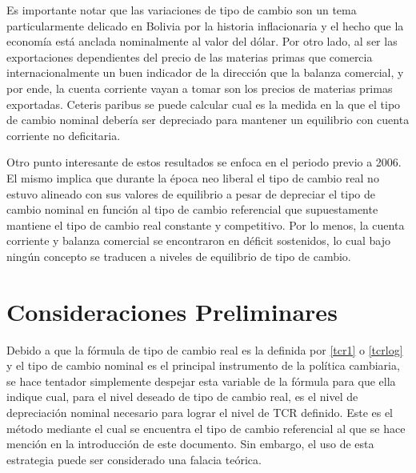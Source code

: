 \documentclass[12pt,letterpaper]{article}
\begin{document}
Es importante notar que las variaciones de tipo de cambio son un tema particularmente delicado en Bolivia por la historia inflacionaria y el hecho que la economía está anclada nominalmente al valor del dólar. Por otro lado, al ser las exportaciones dependientes del precio de las materias primas que comercia internacionalmente un buen indicador de la dirección que la balanza comercial, y por ende, la cuenta corriente vayan a tomar son los precios de materias primas exportadas. Ceteris paribus se puede calcular cual es la medida en la que el tipo de cambio nominal debería ser depreciado para mantener un equilibrio con cuenta corriente no deficitaria.

Otro punto interesante de estos resultados se enfoca en el periodo previo a 2006. El mismo implica que durante la época neo liberal el tipo de cambio real no estuvo alineado con sus valores de equilibrio a pesar de depreciar el tipo de cambio nominal en función al tipo de cambio referencial que supuestamente  mantiene el tipo de cambio real constante y competitivo. Por lo menos, la cuenta corriente y balanza comercial se encontraron en déficit sostenidos, lo cual bajo ningún concepto se traducen a niveles de equilibrio de tipo de cambio.







\section{Consideraciones Preliminares}\label{consid}


Debido a que la fórmula de tipo de cambio real es la definida por \ref{tcr1} o \ref{tcrlog} y el tipo de cambio nominal es el principal instrumento de la política cambiaria, se hace tentador simplemente despejar esta variable de la fórmula para que ella indique cual, para el nivel deseado de tipo de cambio real, es el nivel de depreciación nominal necesario para lograr el nivel de TCR definido. Este es el método mediante el cual se encuentra el tipo de cambio referencial al que se hace mención en la introducción de este documento. Sin embargo, el uso de esta estrategia puede ser considerado una falacia teórica.
\end{document}
